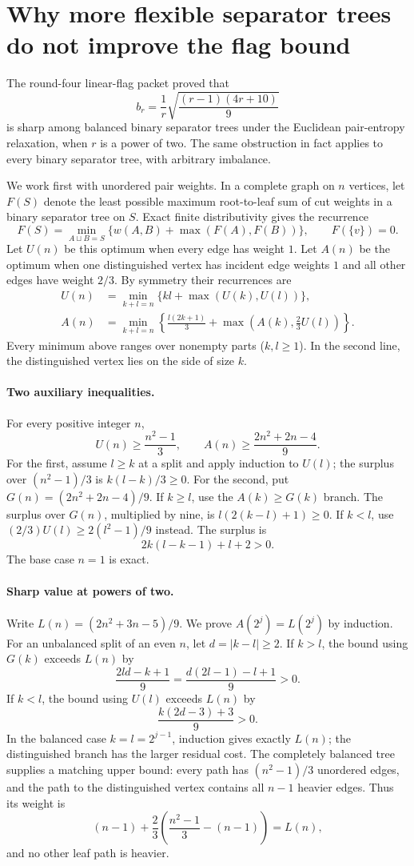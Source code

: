 \section{Why more flexible separator trees do not improve the flag bound}\label{sec:treebarrier}

The round-four linear-flag packet \cite{flags} proved that
\[
 b_r=\frac1r\sqrt{\frac{(r-1)(4r+10)}9}
\]
is sharp among balanced binary separator trees under the Euclidean
pair-entropy relaxation, when $r$ is a power of two. The same obstruction
in fact applies to every binary separator tree, with arbitrary imbalance.

We work first with unordered pair weights. In a complete graph on $n$
vertices, let $F(S)$ denote the least possible maximum root-to-leaf sum of
cut weights in a binary separator tree on $S$. Exact finite distributivity
gives the recurrence
\[
 F(S)=\min_{A\sqcup B=S}\{w(A,B)+\max(F(A),F(B))\},\qquad
 F(\{v\})=0.
\]
Let $U(n)$ be this optimum when every edge has weight $1$. Let $A(n)$ be
the optimum when one distinguished vertex has incident edge weights $1$
and all other edges have weight $2/3$. By symmetry their recurrences are
\begin{align*}
 U(n)&=\min_{k+l=n}\{kl+\max(U(k),U(l))\},\\
 A(n)&=\min_{k+l=n}\left\{\frac{l(2k+1)}3+
                   \max\left(A(k),\frac23U(l)\right)\right\}.
\end{align*}
Every minimum above ranges over nonempty parts ($k,l\ge1$).
In the second line, the distinguished vertex lies on the side of size $k$.

\paragraph{Two auxiliary inequalities.}
For every positive integer $n$,
\[
 U(n)\ge\frac{n^2-1}3,\qquad
 A(n)\ge\frac{2n^2+2n-4}9.
\]
For the first, assume $l\ge k$ at a split and apply induction to $U(l)$;
the surplus over $(n^2-1)/3$ is $k(l-k)/3\ge0$.
For the second, put $G(n)=(2n^2+2n-4)/9$.
If $k\ge l$, use the $A(k)\ge G(k)$ branch. The surplus over $G(n)$,
multiplied by nine, is $l(2(k-l)+1)\ge0$.
If $k<l$, use $(2/3)U(l)\ge2(l^2-1)/9$ instead. The surplus is
\[
 2k(l-k-1)+l+2>0.
\]
The base case $n=1$ is exact.

\paragraph{Sharp value at powers of two.}
Write $L(n)=(2n^2+3n-5)/9$. We prove $A(2^j)=L(2^j)$ by induction.
For an unbalanced split of an even $n$, let $d=|k-l|\ge2$.
If $k>l$, the bound using $G(k)$ exceeds $L(n)$ by
\[
 \frac{2ld-k+1}9=\frac{d(2l-1)-l+1}9>0.
\]
If $k<l$, the bound using $U(l)$ exceeds $L(n)$ by
\[
 \frac{k(2d-3)+3}9>0.
\]
In the balanced case $k=l=2^{j-1}$, induction gives exactly $L(n)$;
the distinguished branch has the larger residual cost. The completely
balanced tree supplies a matching upper bound: every path has
$(n^2-1)/3$ unordered edges, and the path to the distinguished vertex
contains all $n-1$ heavier edges. Thus its weight is
\[
 (n-1)+\frac23\left(\frac{n^2-1}3-(n-1)\right)=L(n),
\]
and no other leaf path is heavier.

